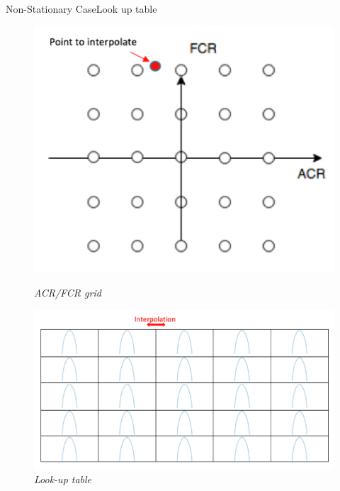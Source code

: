 \documentclass{bredelebeamer}
\begin{document}
\begin{frame}{Non-Stationary Case}{Look up table}

\begin{figure}
   \begin{minipage}[c]{.46\linewidth}
      \includegraphics[scale=0.3]{grid.png}
      \caption{\it ACR/FCR grid}
   \end{minipage} \hfill
   \begin{minipage}[c]{.46\linewidth}
      \includegraphics[scale=0.35]{LUT.png}
      \caption{\it Look-up table}
   \end{minipage}
\end{figure}



\end{frame}
\end{document}
